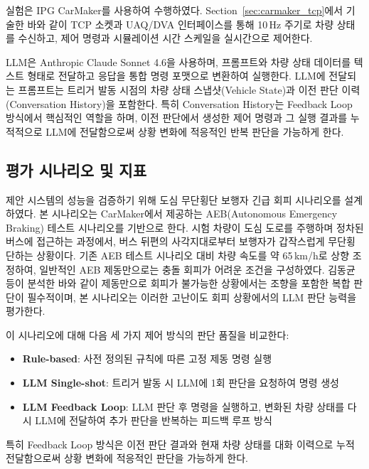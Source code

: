 \documentclass[final,5p,times,twocolumn,9pt]{elsarticle}
\begin{document}
실험은 IPG CarMaker를 사용하여 수행하였다. Section~\ref{sec:carmaker_tcp}에서 기술한 바와 같이 TCP 소켓과 UAQ/DVA 인터페이스를 통해 10\,Hz 주기로 차량 상태를 수신하고, 제어 명령과 시뮬레이션 시간 스케일을 실시간으로 제어한다.

LLM은 Anthropic Claude Sonnet 4.6을 사용하며, 프롬프트와 차량 상태 데이터를 텍스트 형태로 전달하고 응답을 통합 명령 포맷으로 변환하여 실행한다. LLM에 전달되는 프롬프트는 트리거 발동 시점의 차량 상태 스냅샷(Vehicle State)과 이전 판단 이력(Conversation History)을 포함한다. 특히 Conversation History는 Feedback Loop 방식에서 핵심적인 역할을 하며, 이전 판단에서 생성한 제어 명령과 그 실행 결과를 누적적으로 LLM에 전달함으로써 상황 변화에 적응적인 반복 판단을 가능하게 한다.


\subsection{평가 시나리오 및 지표}
\label{sec:evaluation}

제안 시스템의 성능을 검증하기 위해 도심 무단횡단 보행자 긴급 회피 시나리오를 설계하였다. 본 시나리오는 CarMaker에서 제공하는 AEB(Autonomous Emergency Braking) 테스트 시나리오를 기반으로 한다. 시험 차량이 도심 도로를 주행하며 정차된 버스에 접근하는 과정에서, 버스 뒤편의 사각지대로부터 보행자가 갑작스럽게 무단횡단하는 상황이다. 기존 AEB 테스트 시나리오 대비 차량 속도를 약 65\,km/h로 상향 조정하여, 일반적인 AEB 제동만으로는 충돌 회피가 어려운 조건을 구성하였다. 김동균 등\cite{kim2020collision}이 분석한 바와 같이 제동만으로 회피가 불가능한 상황에서는 조향을 포함한 복합 판단이 필수적이며, 본 시나리오는 이러한 고난이도 회피 상황에서의 LLM 판단 능력을 평가한다.

이 시나리오에 대해 다음 세 가지 제어 방식의 판단 품질을 비교한다:

\begin{itemize}
\item \textbf{Rule-based}: 사전 정의된 규칙에 따른 고정 제동 명령 실행
\item \textbf{LLM Single-shot}: 트리거 발동 시 LLM에 1회 판단을 요청하여 명령 생성
\item \textbf{LLM Feedback Loop}: LLM 판단 후 명령을 실행하고, 변화된 차량 상태를 다시 LLM에 전달하여 추가 판단을 반복하는 피드백 루프 방식
\end{itemize}

특히 Feedback Loop 방식은 이전 판단 결과와 현재 차량 상태를 대화 이력으로 누적 전달함으로써 상황 변화에 적응적인 판단을 가능하게 한다.


\end{document}
